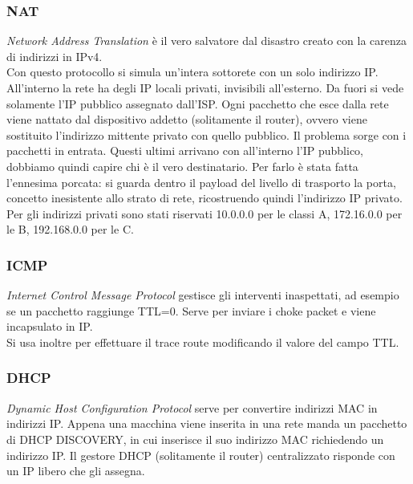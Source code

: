 \documentclass[10pt,a4paper,twoside]{article}
\begin{document}
\subsubsection{NAT}
\textit{Network Address Translation} è il vero salvatore dal disastro creato con la carenza di indirizzi in IPv4.\\
Con questo protocollo si simula un'intera sottorete con un solo indirizzo IP. All'interno la rete ha degli IP locali privati, invisibili all'esterno. Da fuori si vede solamente l'IP pubblico assegnato dall'ISP. Ogni pacchetto che esce dalla rete viene nattato dal dispositivo addetto (solitamente il router), ovvero viene sostituito l'indirizzo mittente privato con quello pubblico. Il problema sorge con i pacchetti in entrata. Questi ultimi arrivano con all'interno l'IP pubblico, dobbiamo quindi capire chi è il vero destinatario. Per farlo è stata fatta l'ennesima porcata: si guarda dentro il payload del livello di trasporto la porta, concetto inesistente allo strato di rete, ricostruendo quindi l'indirizzo IP privato.\\
Per gli indirizzi privati sono stati riservati 10.0.0.0 per le classi A, 172.16.0.0 per le B, 192.168.0.0 per le C.

\subsubsection{ICMP}
\textit{Internet Control Message Protocol} gestisce gli interventi inaspettati, ad esempio se un pacchetto raggiunge TTL=0. Serve per inviare i choke packet e viene incapsulato in IP.\\
Si usa inoltre per effettuare il trace route modificando il valore del campo TTL.

\subsubsection{DHCP}
\textit{Dynamic Host Configuration Protocol} serve per convertire indirizzi MAC in indirizzi IP. Appena una macchina viene inserita in una rete manda un pacchetto di DHCP DISCOVERY, in cui inserisce il suo indirizzo MAC richiedendo un indirizzo IP. Il gestore DHCP (solitamente il router) centralizzato risponde con un IP libero che gli assegna.
\end{document}
